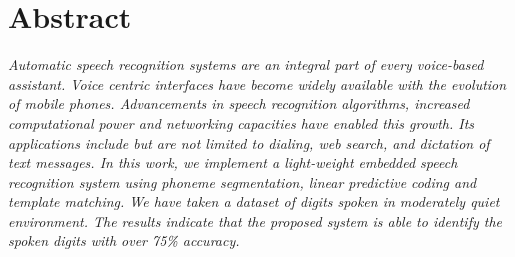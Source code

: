 \newpage
\chapter*{\centering Abstract}

\textit{\quad Automatic speech recognition systems are an integral part of every voice-based assistant. Voice centric interfaces have become widely available with the evolution of mobile phones. Advancements in speech recognition algorithms, increased computational power and networking capacities have enabled this growth. Its applications include but are not limited to dialing, web search, and dictation of text messages. In this work, we implement a light-weight embedded speech recognition system using phoneme segmentation, linear predictive coding and template matching. We have taken a dataset of digits spoken in moderately quiet environment. The results indicate that the proposed system is able to identify the spoken digits with over 75\% accuracy.}
